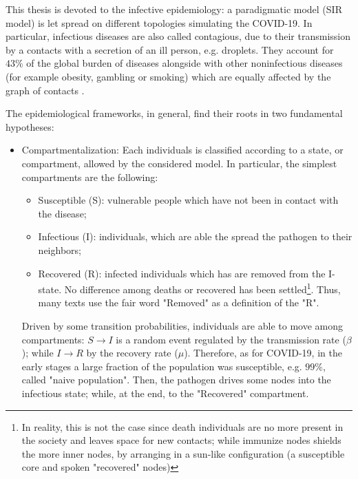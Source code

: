 \documentclass[a4paper,10pt,twoside]{book} %
\theoremstyle{definition}
\begin{document}
This thesis is devoted to the infective epidemiology: a paradigmatic model (SIR model) is let spread on different topologies simulating the COVID-19. In particular, infectious diseases are also called contagious, due to their transmission by a contacts with a secretion of an ill person, e.g. droplets. They account for $43\%$ of the global burden of diseases alongside with other noninfectious diseases (for example obesity, gambling or smoking) which are equally affected by the graph of contacts \cite{barabasi::2016networkbook}.

The epidemiological frameworks, in general, find their roots in two fundamental hypotheses:
\begin{itemize}
	\item Compartmentalization: Each individuals is classified according to a state, or compartment, allowed by the considered model. In particular, the simplest compartments are the following:
	\begin{itemize}
		\item Susceptible (S): vulnerable people which have not been in contact with the disease;
		\item Infectious (I): individuals, which are able the spread the pathogen to their neighbors;
		\item Recovered (R): infected individuals which has are removed from the I-state. No difference among deaths or recovered has been settled\footnote{In reality, this is not the case since death individuals are no more present in the society and leaves space for new contacts; while immunize nodes shields the more inner nodes, by arranging in a sun-like configuration (a susceptible core and spoken "recovered" nodes)}. Thus, many texts use the fair word "Removed" as a definition of the "R".
	\end{itemize}
	
	Driven by some transition probabilities, individuals are able to move among compartments: $S \rightarrow I$ is a random event regulated by the transmission rate ($\beta$); while $I \rightarrow R$ by the recovery rate ($\mu$). Therefore, as for COVID-19, in the early stages a large fraction of the population was susceptible, e.g. $99\%$, called "naive population". Then, the pathogen drives some nodes into the infectious state; while, at the end, to the "Recovered" compartment.


\end{itemize}
\end{document}
